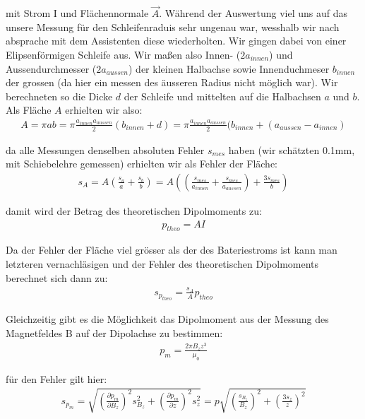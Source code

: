 \documentclass[12pt]{article}
\begin{document}
mit Strom I und Flächennormale $\vec{A}$. Während der Auswertung viel uns auf das unsere Messung für den Schleifenraduis sehr ungenau war, wesshalb wir nach absprache mit dem Assistenten diese wiederholten. Wir gingen dabei von einer Elipsenförmigen Schleife aus. Wir maßen also Innen- ($2a_{innen}$) und Aussendurchmesser ($2a_{aussen}$) der kleinen Halbachse sowie Innenduchmeser $b_{innen}$ der grossen (da hier ein messen des äusseren Radius nicht möglich war). Wir berechneten so die Dicke $d$ der Schleife und mittelten auf die Halbachsen $a$ und $b$. Als Fläche $A$ erhielten wir also:
\begin{align}
 A = \pi a b = \pi \frac{a_{innen} a_{aussen}}{2} (b_{innen} + d) = \pi \frac{a_{innen} a_{aussen}}{2} (b_{innen} + (a_{aussen} - a_{innen})
\end{align}

da alle Messungen denselben absoluten Fehler $s_{mes}$ haben (wir schätzten 0.1mm, mit Schiebelehre gemessen) erhielten wir als Fehler der Fläche:
\begin{align}
 s_A = A \left( \frac{s_a}{a} + \frac{s_b}{b} \right) = A \left( \left( \frac{s_{mes}}{a_{innen}} + \frac{s_{mes}}{a_{aussen}}\right) + \frac{3 s_{mes}}{b} \right)
\end{align}

damit wird der Betrag des theoretischen Dipolmoments zu:
\begin{align}
 p_{theo}=A I
\end{align}

Da der Fehler der Fläche viel grösser als der des Bateriestroms ist kann man letzteren vernachläsigen und der Fehler des theoretischen Dipolmoments berechnet sich dann zu:
\begin{align}
 s_{p_{theo}}= \frac{s_A}{A} p_{theo}
\end{align}

Gleichzeitig gibt es die Möglichkeit das Dipolmoment aus der Messung des Magnetfeldes B auf der Dipolachse zu bestimmen:
\begin{align}
 p_m=\frac{2\pi B_z z^3}{\mu_0}
\end{align}

für den Fehler gilt hier:
\begin{align}
 s_{p_m}=\sqrt{\left( \frac{\partial p_m}{\partial B_z}\right) ^2 s_{B_z}^2+ \left( \frac{\partial p_m}{\partial z}\right) ^2 s_z^2} = p \sqrt{\left( \frac{s_{B_z}}{B_z}\right) ^2 + \left( \frac{3 s_z}{z}\right) ^2}
\end{align}
\end{document}
